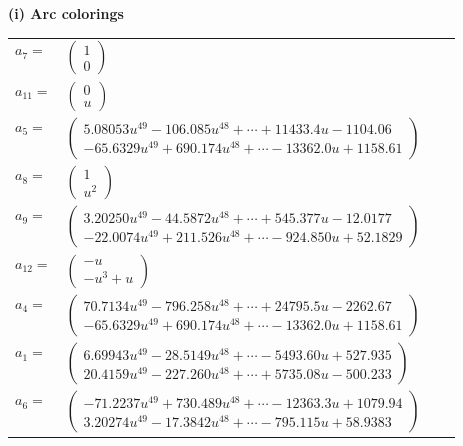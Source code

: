 \documentclass[1p]{elsarticle_modified}
\theoremstyle{definition}
\begin{document}
\flushleft \textbf{(i) Arc colorings}\\
\begin{tabular}{m{7pt} m{180pt} m{7pt} m{180pt} }
\flushright $a_{7}=$&$\begin{pmatrix}1\\0\end{pmatrix}$ \\
\flushright $a_{11}=$&$\begin{pmatrix}0\\u\end{pmatrix}$ \\
\flushright $a_{5}=$&$\begin{pmatrix}5.08053 u^{49}-106.085 u^{48}+\cdots+11433.4 u-1104.06\\-65.6329 u^{49}+690.174 u^{48}+\cdots-13362.0 u+1158.61\end{pmatrix}$ \\
\flushright $a_{8}=$&$\begin{pmatrix}1\\u^2\end{pmatrix}$ \\
\flushright $a_{9}=$&$\begin{pmatrix}3.20250 u^{49}-44.5872 u^{48}+\cdots+545.377 u-12.0177\\-22.0074 u^{49}+211.526 u^{48}+\cdots-924.850 u+52.1829\end{pmatrix}$ \\
\flushright $a_{12}=$&$\begin{pmatrix}- u\\- u^3+u\end{pmatrix}$ \\
\flushright $a_{4}=$&$\begin{pmatrix}70.7134 u^{49}-796.258 u^{48}+\cdots+24795.5 u-2262.67\\-65.6329 u^{49}+690.174 u^{48}+\cdots-13362.0 u+1158.61\end{pmatrix}$ \\
\flushright $a_{1}=$&$\begin{pmatrix}6.69943 u^{49}-28.5149 u^{48}+\cdots-5493.60 u+527.935\\20.4159 u^{49}-227.260 u^{48}+\cdots+5735.08 u-500.233\end{pmatrix}$ \\
\flushright $a_{6}=$&$\begin{pmatrix}-71.2237 u^{49}+730.489 u^{48}+\cdots-12363.3 u+1079.94\\3.20274 u^{49}-17.3842 u^{48}+\cdots-795.115 u+58.9383\end{pmatrix}$ \\

\end{tabular}
\end{document}
